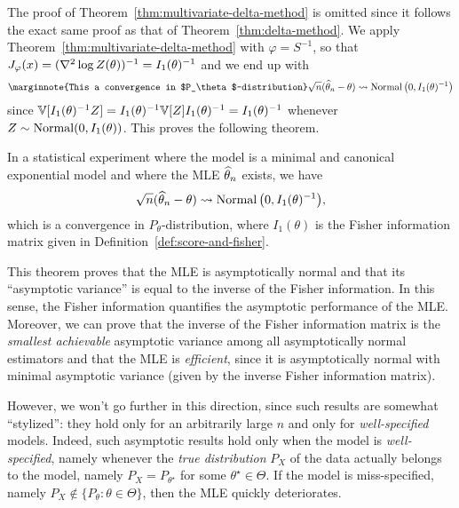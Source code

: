 The proof of Theorem~\ref{thm:multivariate-delta-method} is omitted since it follows the exact same proof as that of Theorem~\ref{thm:delta-method}.
We apply%
Theorem~\ref{thm:multivariate-delta-method} with $\varphi = S^{-1}$, 
so that $J_\varphi(x) = (\nabla^2 \log Z(\theta))^{-1} = I_1(\theta)^{-1}$ and we end up with
\begin{equation*}
	\marginnote{This a convergence in $P_\theta$-distribution}
	\sqrt n (\wh \theta_n - \theta) \gosto \nor\big( 0, I_1(\theta)^{-1} \big)
\end{equation*}
since $\mathbb V[I_1(\theta)^{-1} Z] = I_1(\theta)^{-1} \mathbb V[ Z] I_1(\theta)^{-1} = I_1(\theta)^{-1}$ whenever $Z \sim \operatorname{Normal}( 0, I_1(\theta))$.
This proves the following theorem.
\begin{theorem}
	In a statistical experiment where the model is a minimal and canonical exponential model and where the MLE $\widehat \theta_n$ exists, we have
	\begin{equation*}
		\sqrt n (\widehat \theta_n - \theta) \leadsto \operatorname{Normal}\big( 0, I_1(\theta)^{-1} \big),
	\end{equation*}
	which is a convergence in $P_\theta$-distribution, where $I_1(\theta)$ is the Fisher information matrix given in Definition~\ref{def:score-and-fisher}.
\end{theorem}
This theorem proves that the MLE is asymptotically normal and that its ``asymptotic variance'' is equal to the inverse of the Fisher information.
In this sense, the Fisher information quantifies the asymptotic performance of the MLE.
Moreover, we can prove that the inverse of the Fisher information matrix is the \emph{smallest achievable} asymptotic variance among all asymptotically normal estimators%
and that the MLE is \emph{efficient}, since it is asymptotically normal with minimal asymptotic variance (given by the inverse Fisher information matrix).

However, we won't go further in this direction, since such results are somewhat ``stylized'': they hold only for an arbitrarily large $n$ and only for \emph{well-specified} models.
Indeed, such asymptotic results hold only when the model is \emph{well-specified}, namely whenever the \emph{true distribution} $P_X$ of the data actually belongs to the model, namely $P_X = P_{\theta^\star}$ for some $\theta^\star \in \Theta$.
If the model is miss-specified, namely $P_X \notin \{ P_\theta : \theta \in \Theta \}$, then the MLE quickly deteriorates.
